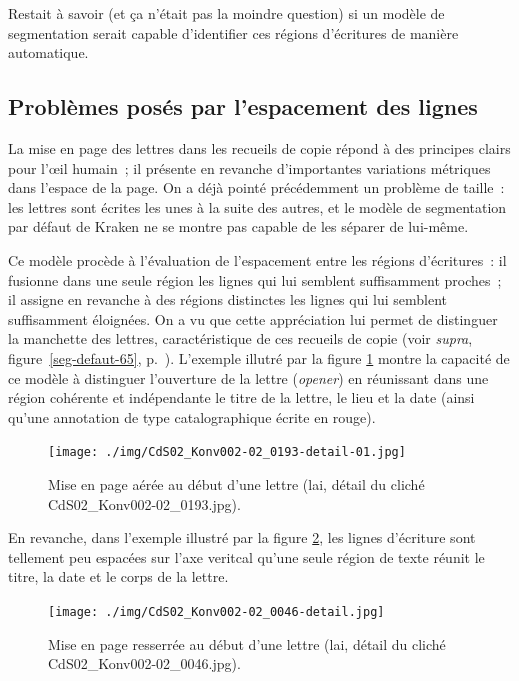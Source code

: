 \documentclass[a4paper,12pt,twoside]{book}
\begin{document}
				Restait à savoir (et ça n'était pas la moindre question) si un modèle de segmentation serait capable d'identifier ces régions d'écritures de manière automatique.
    
		    \subsection{Problèmes posés par l'espacement des lignes}
				La mise en page des lettres dans les recueils de copie répond à des principes clairs pour l'œil humain~; il présente en revanche d'importantes variations métriques dans l'espace de la page. On a déjà pointé précédemment un problème de taille~: les lettres sont écrites les unes à la suite des autres, et le modèle de segmentation par défaut de Kraken ne se montre pas capable de les séparer de lui-même.
				
				Ce modèle procède à l'évaluation de l'espacement entre les régions d'écritures~: il fusionne dans une seule région les lignes qui lui semblent suffisamment proches~; il assigne en revanche à des régions distinctes les lignes qui lui semblent suffisamment éloignées. On a vu que cette appréciation lui permet de distinguer la manchette des lettres, caractéristique de ces recueils de copie (voir \textit{supra}, figure~\ref{seg-defaut-65}, p.~\pageref{seg-defaut-65}). L'exemple illutré par la figure \ref{seg-opener-193} montre la capacité de ce modèle à distinguer l'ouverture de la lettre (\textit{opener}) en réunissant dans une région cohérente et indépendante le titre de la lettre, le lieu et la date (ainsi qu'une annotation de type catalographique écrite en rouge).
				
				\begin{figure}[!h]
					\centering
					\texttt{[image: ./img/CdS02\_Konv002-02\_0193-detail-01.jpg]}%
					\caption{Mise en page aérée au début d'une lettre (\gls{lai}, détail du cliché CdS02\_Konv002-02\_0193.jpg).}%
					\label{seg-opener-193}
				\end{figure}
			
				En revanche, dans l'exemple illustré par la figure \ref{seg-glob-46}, les lignes d'écriture sont tellement peu espacées sur l'axe veritcal qu'une seule région de texte réunit le titre, la date et le corps de la lettre.
			
				\begin{figure}[!h]
					\centering
					\texttt{[image: ./img/CdS02\_Konv002-02\_0046-detail.jpg]}%
					\caption{Mise en page resserrée au début d'une lettre (\gls{lai}, détail du cliché CdS02\_Konv002-02\_0046.jpg).}%
					\label{seg-glob-46}%
				\end{figure}
				
\end{document}
